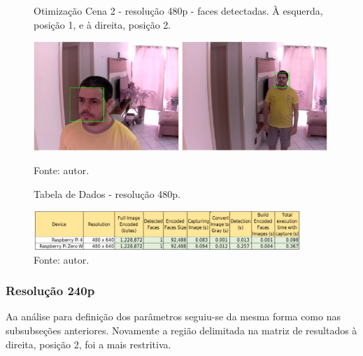 \begin{figure}[H]
    \centering
    \caption[Otimização Cena 2 - resolução 480p - faces detectadas. À esquerda posição 1 e à direita, posição 2]{Otimização Cena 2 - resolução 480p - faces detectadas. À esquerda, posição 1, e à direita, posição 2.}
    \includegraphics[width=0.49\textwidth]{Cap4_Experimentos_Realizados/Figures/cena2_640x480_pos1_face.jpg}
    \includegraphics[width=0.49\textwidth]{Cap4_Experimentos_Realizados/Figures/cena2_640x480_pos2_face.jpg}
    \caption*{Fonte: autor.}
    \label{fig:otimizacaoCena2_480p_faces}
\end{figure}

\begin{figure}[H]
    \centering
    \caption[Tabela de Dados - resolução 480p.]{Tabela de Dados - resolução 480p.}
    \includegraphics[width=0.90\textwidth]{Cap4_Experimentos_Realizados/Figures/cena2_dados_480p.jpg}
    \caption*{Fonte: autor.}
    \label{fig:dadosCena2_480p}
\end{figure}

\subsubsection{Resolução 240p} \label{sssec:resolution2-3}

Aa análise para definição dos parâmetros seguiu-se da mesma forma como nas subsubseções anteriores. Novamente a região delimitada na matriz de resultados à direita, posição 2, foi a mais restritiva.

